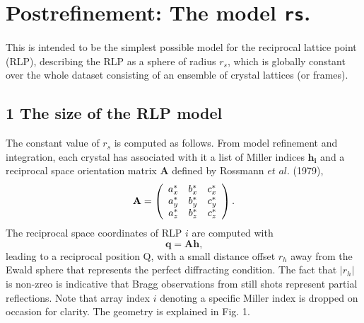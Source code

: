 \documentclass[12pt, letterpaper]{article}
\begin{document}

\section*{Postrefinement: The model {\tt rs}. }
  \par This is intended to be the simplest possible model for the reciprocal lattice point (RLP), 
  describing the RLP as a sphere of radius ${r_s}$, which is globally constant over the whole dataset
  consisting of an ensemble of crystal lattices (or frames).  
\subsection*{1 The size of the RLP model}

  \par The constant value of ${r_s}$ is computed as follows.
  From model refinement and integration, each crystal has associated with it a list of Miller indices 
  $\mathbf{h_i}$ and a reciprocal space orientation matrix $\mathbf{A}$ 
  defined by Rossmann $\textit{et\ al.}$ (1979),
    \begin{equation}
    \mathbf{A} = 
    \left(
    \begin{array}{c c c}
      a_{x}^{*}   &  b_{x}^{*}   & c_{x}^{*}  \\
      a_{y}^{*}   &  b_{y}^{*}   & c_{y}^{*}  \\
      a_{z}^{*}   &  b_{z}^{*}   & c_{z}^{*}  \\
    \end{array}
    \right)
    \text{.}
    \label{eqn:RossmannA}
  \end{equation}
  The reciprocal space coordinates of RLP $i$ are computed with 
    \begin{equation}
    \mathbf{q} = \mathbf{A}\mathbf{h}
    \text{,}
    \label{eqn:Ah}
  \end{equation}
  leading to a reciprocal position Q, with a small distance offset
   ${r_h}$ away from the Ewald sphere that represents the perfect diffracting condition.  
  The fact that $|{r_h}|$ is non-zreo is indicative that
  Bragg observations from still shots represent partial reflections.  Note that array index $i$ denoting
  a specific Miller index is dropped on occasion for clarity.  The geometry is explained in Fig. 1. 
  
\end{document}
